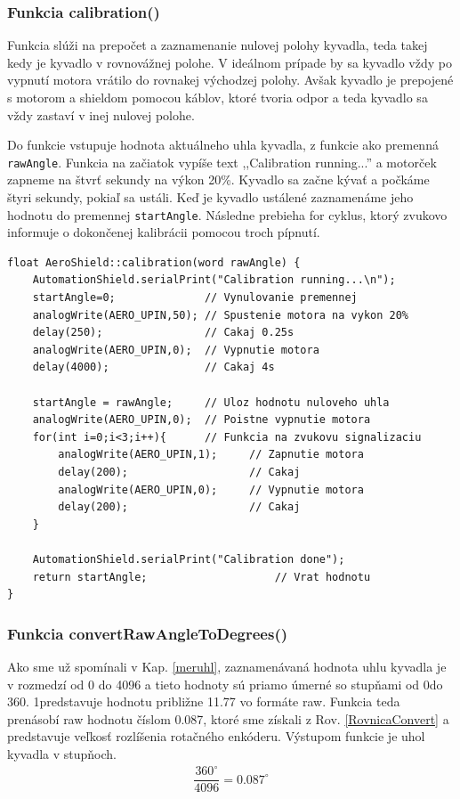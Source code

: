 \subsubsection{Funkcia calibration()}

Funkcia  slúži na prepočet a zaznamenanie nulovej polohy kyvadla, teda takej kedy je kyvadlo v rovnovážnej polohe. V ideálnom prípade by sa kyvadlo vždy po vypnutí motora vrátilo do rovnakej východzej polohy. Avšak kyvadlo je prepojené s motorom a shieldom pomocou káblov, ktoré tvoria odpor a teda kyvadlo sa vždy zastaví v inej nulovej polohe. 

Do funkcie vstupuje hodnota aktuálneho uhla kyvadla, z funkcie  ako premenná \verb|rawAngle|. Funkcia na začiatok vypíše text ,,Calibration running...'' a motorček zapneme na štvrť sekundy na výkon 20\%. Kyvadlo sa začne kývať a počkáme štyri sekundy, pokiaľ sa ustáli. Keď je kyvadlo ustálené zaznamenáme jeho hodnotu do premennej \verb|startAngle|. Následne prebieha for cyklus, ktorý zvukovo informuje o dokončenej kalibrácii pomocou troch pípnutí. 

\begin{lstlisting}[caption={Zdrojový kód funkcie calibration.},captionpos=b]
float AeroShield::calibration(word rawAngle) {  
	AutomationShield.serialPrint("Calibration running...\n");  
	startAngle=0;              // Vynulovanie premennej 
	analogWrite(AERO_UPIN,50); // Spustenie motora na vykon 20%
	delay(250);                // Cakaj 0.25s 
	analogWrite(AERO_UPIN,0);  // Vypnutie motora
	delay(4000);               // Cakaj 4s
	
	startAngle = rawAngle;     // Uloz hodnotu nuloveho uhla
	analogWrite(AERO_UPIN,0);  // Poistne vypnutie motora 
	for(int i=0;i<3;i++){      // Funkcia na zvukovu signalizaciu
		analogWrite(AERO_UPIN,1);     // Zapnutie motora
		delay(200);                   // Cakaj
		analogWrite(AERO_UPIN,0);     // Vypnutie motora
		delay(200);                   // Cakaj
	}
	
	AutomationShield.serialPrint("Calibration done");
	return startAngle;                    // Vrat hodnotu 
}
\end{lstlisting}

\subsubsection{Funkcia convertRawAngleToDegrees()}

Ako sme už spomínali v Kap. \ref{meruhl}, zaznamenávaná hodnota uhlu kyvadla je v rozmedzí od 0 do 4096 a tieto hodnoty sú priamo úmerné so stupňami od 0\textdegree  do 360\textdegree. 1\textdegree   predstavuje hodnotu približne 11.77 vo formáte raw. Funkcia teda prenásobí raw hodnotu číslom 0.087\textdegree, ktoré sme získali z Rov. \ref{RovnicaConvert} a predstavuje veľkosť rozlíšenia rotačného enkóderu. Výstupom funkcie je uhol kyvadla v stupňoch.
 \begin{align}
 	\label{RovnicaConvert}
 	  \dfrac{360^{\circ}}{4096} = 0.087^{\circ}
 \end{align}

